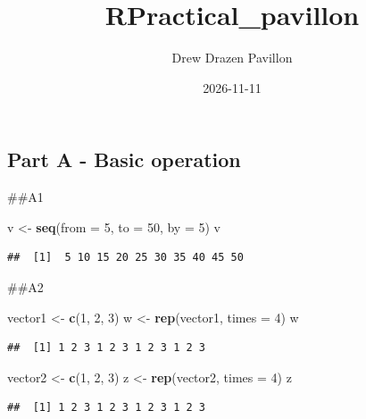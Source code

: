 \documentclass[
]{article}
\title{RPractical\_pavillon}
\author{Drew Drazen Pavillon}
\date{2026-11-11}
\newenvironment{Shaded}{\begin{snugshade}}{\end{snugshade}}
\newcommand{\AttributeTok}[1]{\textcolor[rgb]{0.13,0.29,0.53}{#1}}
\newcommand{\DecValTok}[1]{\textcolor[rgb]{0.00,0.00,0.81}{#1}}
\newcommand{\FunctionTok}[1]{\textcolor[rgb]{0.13,0.29,0.53}{\textbf{#1}}}
\newcommand{\NormalTok}[1]{#1}
\newcommand{\OtherTok}[1]{\textcolor[rgb]{0.56,0.35,0.01}{#1}}
\begin{document}
\maketitle

\subsection{Part A - Basic operation}\label{part-a---basic-operation}

\#\#A1

\begin{Shaded}
\begin{Highlighting}[]
\NormalTok{v }\OtherTok{\textless{}{-}} \FunctionTok{seq}\NormalTok{(}\AttributeTok{from =} \DecValTok{5}\NormalTok{, }\AttributeTok{to =} \DecValTok{50}\NormalTok{, }\AttributeTok{by =} \DecValTok{5}\NormalTok{)}
\NormalTok{v}
\end{Highlighting}
\end{Shaded}

\begin{verbatim}
##  [1]  5 10 15 20 25 30 35 40 45 50
\end{verbatim}

\#\#A2

\begin{Shaded}
\begin{Highlighting}[]
\NormalTok{vector1 }\OtherTok{\textless{}{-}} \FunctionTok{c}\NormalTok{(}\DecValTok{1}\NormalTok{, }\DecValTok{2}\NormalTok{, }\DecValTok{3}\NormalTok{)}
\NormalTok{w }\OtherTok{\textless{}{-}} \FunctionTok{rep}\NormalTok{(vector1, }\AttributeTok{times =} \DecValTok{4}\NormalTok{)}
\NormalTok{w}
\end{Highlighting}
\end{Shaded}

\begin{verbatim}
##  [1] 1 2 3 1 2 3 1 2 3 1 2 3
\end{verbatim}

\begin{Shaded}
\begin{Highlighting}[]
\NormalTok{vector2 }\OtherTok{\textless{}{-}} \FunctionTok{c}\NormalTok{(}\DecValTok{1}\NormalTok{, }\DecValTok{2}\NormalTok{, }\DecValTok{3}\NormalTok{)}
\NormalTok{z }\OtherTok{\textless{}{-}} \FunctionTok{rep}\NormalTok{(vector2, }\AttributeTok{times =} \DecValTok{4}\NormalTok{)}
\NormalTok{z}
\end{Highlighting}
\end{Shaded}

\begin{verbatim}
##  [1] 1 2 3 1 2 3 1 2 3 1 2 3
\end{verbatim}
\end{document}
